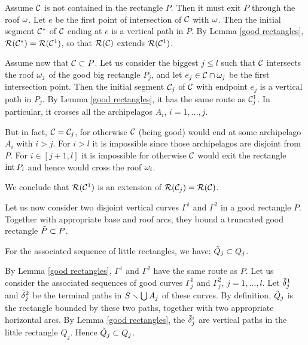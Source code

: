 \begin{pf}
  Assume ${\cal C}$ is not contained in the rectangle $P$. Then it must exit $P$ through the roof ${\omega}$.  
Let $e$ be the first point of intersection of ${\cal C}$ with ${\omega}$. Then the initial   segment ${\cal C}^*$  of ${\cal C}$ ending at $e$
is a vertical path in $P$. By Lemma \ref{good rectangles},  ${\cal R}({\cal C}^*)= {\cal R}({\cal C}^1)$, 
so that ${\cal R}({\cal C})$ extends ${\cal R}({\cal C}^1)$. 

\ssk
Assume now that ${\cal C}\subset P$.
  Let us consider the biggest $j\leq l$ such that ${\cal C}$ intersects  the roof ${\omega}_j$ of the good big rectangle $P_j$,
and let $e_j\in {\cal C}\cap {\omega}_j$ be the first intersection point.  Then the initial segment ${\cal C}_j$ of ${\cal C}$
with endpoint $e_j$ is a vertical path in $P_j$. By Lemma \ref{good rectangles},
it has the same  route as ${\cal C}_j^1$. In particular, it crosses all the archipelagos $A_i$, $i=1,\dots, j$. 

But in fact, ${\cal C}={\cal C}_j$, for otherwise ${\cal C}$ (being good) would end at some archipelago $A_i$ with $i>j$.
For $i>l$ it is impossible since those archipelagos are disjoint from $P$. For $i\in [j+1, l]$ it is impossible
for otherwise ${\cal C}$ would exit the rectangle $\operatorname{int} P_i$ and hence would cross the roof ${\omega}_i$.   

We conclude that  ${\cal R}({\cal C}^1)$ is an extension of ${\cal R}({\cal C}_j)={\cal R}({\cal C})$. 
\end{pf}



Let us now consider two disjoint vertical curves $\Gamma^1$ and $\Gamma^2$ in a good rectangle $P$.
Together with appropriate  base and roof arcs, they bound a truncated good  rectangle $\tilde P\subset P$.

\begin{lem}\label{inclusions}
 For the associated sequence of  little rectangles, we have:
  $\tilde Q_j \subset Q_j $. 
\end{lem}

\begin{pf}
By   Lemma \ref{good rectangles}, $\Gamma^1$ and $\Gamma^2$ have the same route as $P$.
Let us consider the associated sequences of good curves $\Gamma^1_j$ and $\Gamma^2_j$, $j=1,\dots, l$.
Let $\tilde{{\delta}}^1_j$ and $\tilde{{\delta}}^2_j$ be the terminal paths in $S\smallsetminus \bigcup A_j$  of these curves.
By definition, $\tilde Q_j$ is the rectangle  bounded by these two paths, 
together with two appropriate horizontal arcs. 
By   Lemma \ref{good rectangles}, the $\tilde{{\delta}}^i_j$ are vertical paths in  
the little rectangle $Q_j$.
Hence $\tilde Q_j\subset Q_j$.
\end{pf} 

